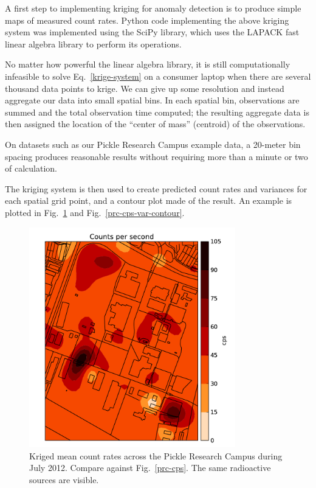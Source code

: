 A first step to implementing kriging for anomaly detection is to produce simple
maps of measured count rates. Python code implementing the above kriging system
was implemented using the SciPy library, which uses the LAPACK fast linear
algebra library to perform its operations. 

No matter how powerful the linear algebra library, it is still computationally
infeasible to solve Eq.~\ref{krige-system} on a consumer laptop when there are
several thousand data points to krige. We can give up some resolution and
instead aggregate our data into small spatial bins. In each spatial bin,
observations are summed and the total observation time computed; the resulting
aggregate data is then assigned the location of the ``center of mass''
(centroid) of the observations.

On datasets such as our Pickle Research Campus example data, a 20-meter bin
spacing produces reasonable results without requiring more than a minute or two
of calculation.

The kriging system is then used to create predicted count rates and variances
for each spatial grid point, and a contour plot made of the result. An example
is plotted in Fig.~\ref{prc-cps-contour} and Fig.~\ref{prc-cps-var-contour}.

\begin{figure}
  \centering
  \includegraphics[width=0.8\textwidth]{figures/prc-cps-contour.pdf}
  \caption{Kriged mean count rates across the Pickle Research Campus during July
    2012. Compare against Fig.~\ref{prc-cps}. The same radioactive sources are visible.}
  \label{prc-cps-contour}
\end{figure}

